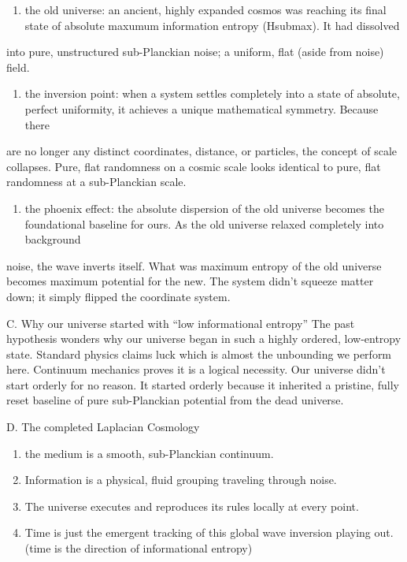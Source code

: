 \begin{enumerate}
\item the old universe: an ancient, highly expanded cosmos was reaching its final state of absolute maxumum information entropy (Hsubmax). It had dissolved
\end{enumerate}

into pure, unstructured sub-Planckian noise; a uniform, flat (aside from noise) field.

\begin{enumerate}
\item the inversion point: when a system settles completely into a state of absolute, perfect uniformity, it achieves a unique mathematical symmetry. Because there
\end{enumerate}

are no longer any distinct coordinates, distance, or particles, the concept of scale collapses. Pure, flat randomness on a cosmic scale looks identical to pure, flat randomness at a sub-Planckian scale.

\begin{enumerate}
\item the phoenix effect: the absolute dispersion of the old universe becomes the foundational baseline for ours. As the old universe relaxed completely into background
\end{enumerate}

noise, the wave inverts itself. What was maximum entropy of the old universe becomes maximum potential for the new. The system didn't squeeze matter down; it simply flipped the coordinate system.

C. Why our universe started with ``low informational entropy'' The past hypothesis wonders why our universe began in such a highly ordered, low-entropy state. Standard physics claims luck which is almost the unbounding we perform here. Continuum mechanics proves it is a logical necessity. Our universe didn't start orderly for no reason. It started orderly because it inherited a pristine, fully reset baseline of pure sub-Planckian potential from the dead universe.

D. The completed Laplacian Cosmology

\begin{enumerate}
\item the medium is a smooth, sub-Planckian continuum.
\item Information is a physical, fluid grouping traveling through noise.
\item The universe executes and reproduces its rules locally at every point.
\item Time is just the emergent tracking of this global wave inversion playing out. (time is the direction of informational entropy)
\end{enumerate}

